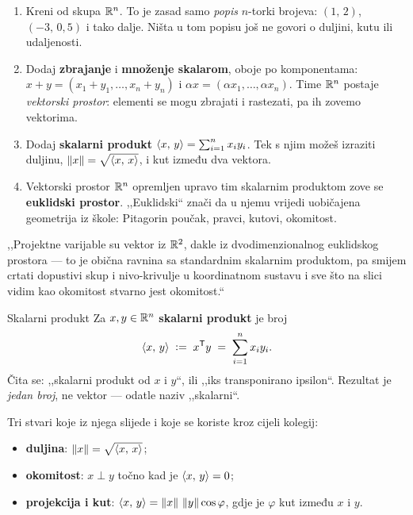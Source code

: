 \begin{korak}
\begin{enumerate}[leftmargin=*]
  \item Kreni od skupa $\mathbb{R}^n$. To je zasad samo \emph{popis} $n$-torki brojeva:
        $(1,\,2)$, $(-3,\,0{,}5)$ i tako dalje. Ništa u tom popisu još ne govori
        o duljini, kutu ili udaljenosti.
  \item Dodaj \textbf{zbrajanje} i \textbf{množenje skalarom}, oboje po
        komponentama:
        $x + y = (x_1+y_1, \dots, x_n+y_n)$ i $\alpha x = (\alpha x_1, \dots, \alpha x_n)$.
        Time $\mathbb{R}^n$ postaje \emph{vektorski prostor}: elementi se mogu zbrajati i
        rastezati, pa ih zovemo vektorima.
  \item Dodaj \textbf{skalarni produkt} $\left\langle x,\, y \right\rangle = \sum_{i=1}^{n} x_i y_i$.
        Tek s njim možeš izraziti duljinu, $\left\lVert x \right\rVert = \sqrt{\left\langle x,\, x \right\rangle}$, i kut
        između dva vektora.
  \item Vektorski prostor $\mathbb{R}^n$ opremljen upravo tim skalarnim produktom zove se
        \textbf{euklidski prostor}. ,,Euklidski`` znači da u njemu vrijedi
        uobičajena geometrija iz škole: Pitagorin poučak, pravci, kutovi, okomitost.
\end{enumerate}
\end{korak}

\begin{izgovor}
,,Projektne varijable su vektor iz $\mathbb{R}^2$, dakle iz dvodimenzionalnog euklidskog
prostora --- to je obična ravnina sa standardnim skalarnim produktom, pa smijem
crtati dopustivi skup i nivo-krivulje u koordinatnom sustavu i sve što na slici
vidim kao okomitost stvarno jest okomitost.``
\end{izgovor}

\begin{pojam}{Skalarni produkt}
Za $x, y \in \mathbb{R}^n$ \textbf{skalarni produkt} je broj
\begin{equation}
\left\langle x,\, y \right\rangle \;\mathrel{\vcentcolon=}\; x^{\mathsf{T}} y \;=\; \sum_{i=1}^{n} x_i y_i .
\label{eq:skalarni-produkt}
\end{equation}
Čita se: ,,skalarni produkt od $x$ i $y$``, ili ,,iks transponirano ipsilon``.
Rezultat je \emph{jedan broj}, ne vektor --- odatle naziv ,,skalarni``.

Tri stvari koje iz njega slijede i koje se koriste kroz cijeli kolegij:
\begin{itemize}[nosep,leftmargin=*]
  \item \textbf{duljina}: $\left\lVert x \right\rVert = \sqrt{\left\langle x,\, x \right\rangle}$;
  \item \textbf{okomitost}: $x \perp y$ točno kad je $\left\langle x,\, y \right\rangle = 0$;
  \item \textbf{projekcija i kut}: $\left\langle x,\, y \right\rangle = \left\lVert x \right\rVert\,\left\lVert y \right\rVert\cos\varphi$,
        gdje je $\varphi$ kut između $x$ i $y$.
\end{itemize}
\end{pojam}

